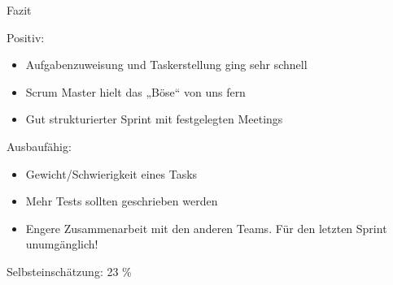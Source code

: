 \begin{frame}{Fazit}
	\par{Positiv:}
	\begin{itemize}
		\item Aufgabenzuweisung und Taskerstellung ging sehr schnell
		\item Scrum Master hielt das „Böse“ von uns fern
		\item Gut strukturierter Sprint mit festgelegten Meetings
	\end{itemize}

	\par{Ausbaufähig:}
	\begin{itemize}
		\item Gewicht/Schwierigkeit eines Tasks
		\item Mehr Tests sollten geschrieben werden
		\item Engere Zusammenarbeit mit den anderen Teams. Für den letzten Sprint unumgänglich!
	\end{itemize}

	\par{ Selbsteinschätzung: 23 \% }
\end{frame}
